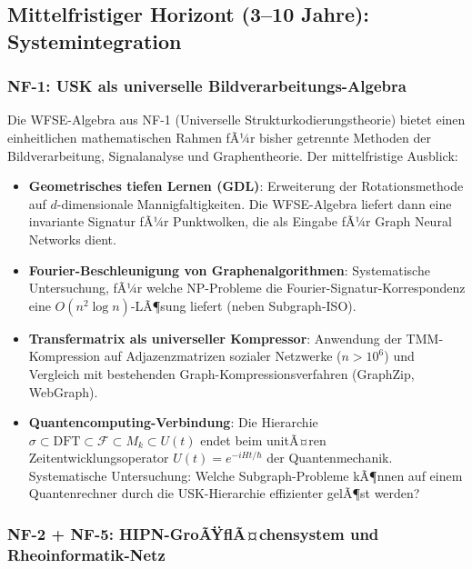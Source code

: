 ﻿\documentclass[a4paper,12pt]{scrreprt}
\theoremstyle{definition}
\begin{document}
\subsection{Mittelfristiger Horizont (3--10 Jahre): Systemintegration}

\subsubsection{NF-1: USK als universelle Bildverarbeitungs-Algebra}

Die WFSE-Algebra aus NF-1 (Universelle Strukturkodierungstheorie) bietet
einen einheitlichen mathematischen Rahmen fÃ¼r bisher getrennte Methoden
der Bildverarbeitung, Signalanalyse und Graphentheorie. Der mittelfristige
Ausblick:
\begin{itemize}
  \item \textbf{Geometrisches tiefen Lernen (GDL)}: Erweiterung der
    Rotationsmethode auf $d$-dimensionale Mannigfaltigkeiten. Die
    WFSE-Algebra liefert dann eine invariante Signatur fÃ¼r Punktwolken,
    die als Eingabe fÃ¼r Graph Neural Networks dient.
  \item \textbf{Fourier-Beschleunigung von Graphenalgorithmen}: Systematische
    Untersuchung, fÃ¼r welche NP-Probleme die Fourier-Signatur-Korrespondenz
    eine $O(n^2 \log n)$-LÃ¶sung liefert (neben Subgraph-ISO).
  \item \textbf{Transfermatrix als universeller Kompressor}: Anwendung
    der TMM-Kompression auf Adjazenzmatrizen sozialer Netzwerke
    ($n > 10^6$) und Vergleich mit bestehenden Graph-Kompressionsverfahren
    (GraphZip, WebGraph).
  \item \textbf{Quantencomputing-Verbindung}: Die
    Hierarchie $\sigma \subset \mathrm{DFT} \subset \mathcal{F} \subset
    M_k \subset U(t)$ endet beim unitÃ¤ren Zeitentwicklungsoperator
    $U(t) = e^{-iHt/\hbar}$ der Quantenmechanik. Systematische
    Untersuchung: Welche Subgraph-Probleme kÃ¶nnen auf einem Quantenrechner
    durch die USK-Hierarchie effizienter gelÃ¶st werden?
\end{itemize}

\subsubsection{NF-2 + NF-5: HIPN-GroÃŸflÃ¤chensystem und Rheoinformatik-Netz}
\end{document}
